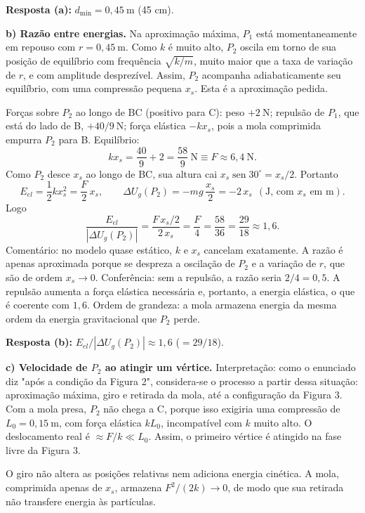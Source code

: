 \documentclass{article}%
\begin{document}
\textbf{Resposta (a):} $d_{\min} = 0{,}45\ \mathrm{m}$ (45 cm).

\textbf{b) Razão entre energias.} Na aproximação máxima, $P_1$ está momentaneamente em repouso com $r = 0{,}45\ \mathrm{m}$. Como $k$ é muito alto, $P_2$ oscila em torno de sua posição de equilíbrio com frequência $\sqrt{k/m}$, muito maior que a taxa de variação de $r$, e com amplitude desprezível. Assim, $P_2$ acompanha adiabaticamente seu equilíbrio, com uma compressão pequena $x_s$. Esta é a aproximação pedida.

Forças sobre $P_2$ ao longo de BC (positivo para C): peso $+2\ \mathrm{N}$; repulsão de $P_1$, que está do lado de B, $+40/9\ \mathrm{N}$; força elástica $-kx_s$, pois a mola comprimida empurra $P_2$ para B. Equilíbrio:
\[
kx_s = \frac{40}{9} + 2 = \frac{58}{9}\ \mathrm{N} \equiv F \approx 6{,}4\ \mathrm{N}.
\]
Como $P_2$ desce $x_s$ ao longo de BC, sua altura cai $x_s\operatorname{sen}30^\circ = x_s/2$. Portanto
\[
E_{el} = \frac{1}{2}kx_s^2 = \frac{F}{2}\,x_s,
\qquad
\Delta U_g(P_2) = -mg\,\frac{x_s}{2} = -2\,x_s\ \ (\text{J, com } x_s \text{ em m}).
\]
Logo
\[
\frac{E_{el}}{|\Delta U_g(P_2)|} = \frac{F\,x_s/2}{2\,x_s} = \frac{F}{4} = \frac{58}{36} = \frac{29}{18}\approx 1{,}6.
\]
Comentário: no modelo quase estático, $k$ e $x_s$ cancelam exatamente. A razão é apenas aproximada porque se despreza a oscilação de $P_2$ e a variação de $r$, que são de ordem $x_s\to 0$. Conferência: sem a repulsão, a razão seria $2/4 = 0{,}5$. A repulsão aumenta a força elástica necessária e, portanto, a energia elástica, o que é coerente com $1{,}6$. Ordem de grandeza: a mola armazena energia da mesma ordem da energia gravitacional que $P_2$ perde.

\textbf{Resposta (b):} $E_{el}/|\Delta U_g(P_2)|\approx 1{,}6$ ($=29/18$).

\textbf{c) Velocidade de $P_2$ ao atingir um vértice.} Interpretação: como o enunciado diz "após a condição da Figura 2", considera-se o processo a partir dessa situação: aproximação máxima, giro e retirada da mola, até a configuração da Figura 3. Com a mola presa, $P_2$ não chega a C, porque isso exigiria uma compressão de $L_0 = 0{,}15\ \mathrm{m}$, com força elástica $kL_0$, incompatível com $k$ muito alto. O deslocamento real é $\approx F/k \ll L_0$. Assim, o primeiro vértice é atingido na fase livre da Figura 3.

O giro não altera as posições relativas nem adiciona energia cinética. A mola, comprimida apenas de $x_s$, armazena $F^2/(2k)\to 0$, de modo que sua retirada não transfere energia às partículas.
\end{document}
